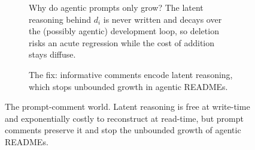 \begin{figure}[t]
  \centering
  \begin{subfigure}[b]{0.58\textwidth}
    \centering
    \resizebox{\linewidth}{!}{}
    \caption{
      Why do agentic prompts only grow? The latent reasoning behind $d_i$ is never written and decays over
      the (possibly agentic) development loop, so deletion risks an acute regression while the cost of
      addition stays diffuse.
    }
    \label{fig:flow}
  \end{subfigure}\hfill
  \begin{subfigure}[b]{0.38\textwidth}
    \centering
    \caption{
      The fix: informative comments encode latent reasoning, which stops
      unbounded growth in agentic READMEs.
    }
    \label{fig:comment}
  \end{subfigure}
  \caption{
    The prompt-comment world. Latent reasoning is free at write-time and exponentially costly to reconstruct
    at read-time, but prompt comments preserve it and stop the unbounded growth of agentic READMEs.
  }
  \label{fig:comment_world}
\end{figure}
